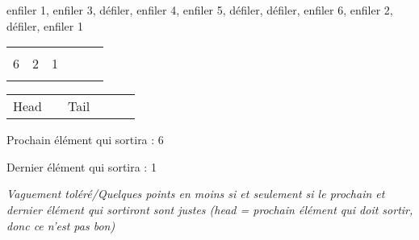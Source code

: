 \documentclass[11pt,a4paper]{article}
\begin{document}
\begin{center}

\begin{large}
enfiler 1, enfiler 3, défiler, enfiler 4, enfiler 5, défiler, défiler, enfiler 6, enfiler 2, défiler, enfiler 1
\end{large}

\medskip

\begin{tabular}{|C{1cm}|C{1cm}|C{1cm}|C{1cm}|C{1cm}|C{1cm}|}
\hline
  &   &   &   &   & \\
6 & 2 & 1 &   &   & \\
  &   &   &   &   & \\
\hline
\end{tabular}

\begin{tabular}{ C{1cm} C{1cm} C{1cm} C{1cm} C{1cm} C{1cm} }
 Head & & Tail & & & \\
\end{tabular}

\medskip






\begin{table}[ht!]
  \begin{minipage}{0.50\textwidth}

Prochain élément qui sortira : 6

  \end{minipage}
  \hfillx
  \begin{minipage}{0.50\textwidth}

Dernier élément qui sortira : 1

  \end{minipage}
\end{table}


\textit{Vaguement toléré/Quelques points en moins si et seulement si le prochain et dernier élément qui sortiront sont justes (head = prochain élément qui doit sortir, donc ce n'est pas bon)}


\end{center}
\end{document}
